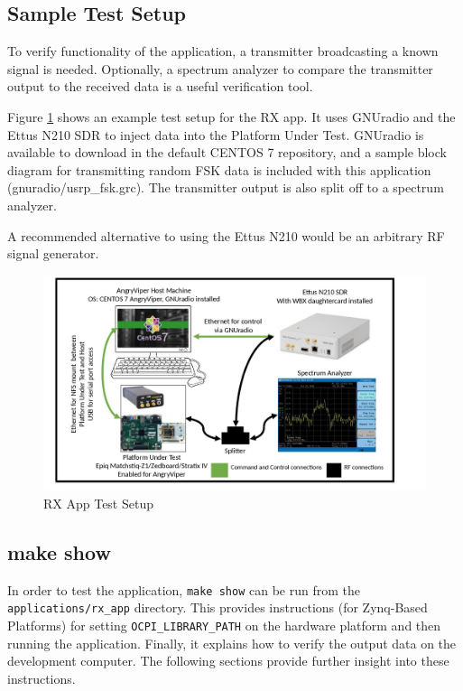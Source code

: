 \subsection{Sample Test Setup}
\noindent To verify functionality of the application, a transmitter broadcasting a known signal is needed. Optionally, a spectrum analyzer to compare the transmitter output to the received data is a useful verification tool.\par\medskip
\noindent Figure \ref{fig:rx_app_test_setup} shows an example test setup for the RX app. It uses GNUradio and the Ettus N210 SDR to inject data into the Platform Under Test. GNUradio is available to download in the default CENTOS 7 repository, and a sample block diagram for transmitting random FSK data is included with this application (gnuradio/usrp\_fsk.grc). The transmitter output is also split off to a spectrum analyzer.\par\bigskip
\noindent A recommended alternative to using the Ettus N210 would be an arbitrary RF signal generator.
	\begin{figure}[h]
	 	\centering
		\includegraphics[scale=.55]{rx_app_test_setup}
		\caption{RX App Test Setup}
		\label{fig:rx_app_test_setup}
	\end{figure}
\subsection{make show}
\noindent In order to test the application, \texttt{make show} can be run from the \texttt{applications/rx\_app} directory. This provides instructions (for Zynq-Based Platforms) for setting \texttt{OCPI\_LIBRARY\_PATH} on the hardware platform and then running the application. Finally, it explains how to verify the output data on the development computer. The following sections provide further insight into these instructions.
